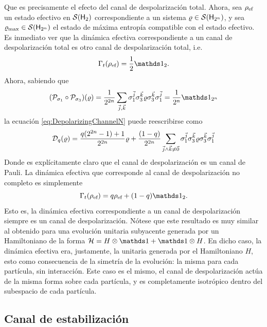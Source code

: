 Que es precisamente el efecto del canal de despolarización total. Ahora, sea $\rho_{\text{ef}}$ un estado efectivo en $\mathcal{S}({\sf H}_{2})$ correspondiente a un sistema $\varrho \in \mathcal{S}({\sf H}_{2^{n}})$, y sea $\varrho_{\max}\in\mathcal{S}({\sf H}_{2^{n}})$ el estado de máxima entropía compatible con el estado efectivo. Es inmediato ver que la dinámica efectiva correspondiente a un canal de despolarización total es otro canal de despolarización total, i.e.
\begin{equation}
    \Gamma_{t}(\rho_{\ef})=\frac{1}{2}\Id_{2}.
\end{equation}
Ahora, sabiendo que
\begin{equation}
    \qty(\mcP_{\pauli{1}}\circ \mcP_{\pauli{3}})(\varrho)=\frac{1}{2^{2n}}\sum_{\vec{j},\vec{k}}\pauli{1}^{\vec{j}}\pauli{3}^{\vec{k}}\varrho\pauli{3}^{\vec{k}}\pauli{1}^{\vec{j}}=\frac{1}{2^{n}}\Id_{2^{n}}\nonumber
\end{equation}
la ecuación \ref{eq:DepolarizingChannelN} puede reescribirse como
\begin{equation}
    \mathcal{D}_{q}(\varrho)=\frac{q(2^{2n}-1)+1}{2^{2n}}\varrho+\frac{(1-q)}{2^{2n}}\sum_{\vec{j}\land\vec{k}\neq\vec{0}}\sigma_{1}^{\vec{j}}\sigma_{3}^{\vec{k}}\varrho\sigma_{3}^{\vec{k}}\sigma_{1}^{\vec{j}}\nonumber
\end{equation}
Donde es explícitamente claro que el canal de despolarización es un canal de Pauli. La dinámica efectiva que corresponde al canal de despolarización no completo es simplemente
\begin{equation}\label{eq:EffectiveDepolarizing}
    \Gamma_{t}(\rho_{\ef})=q\rho_{\ef}+(1-q)\Id_{2}.
\end{equation}
Esto es, la dinámica efectiva correspondiente a un canal de despolarización siempre es un canal de despolarización. Nótese que este resultado es muy similar al obtenido para una evolución unitaria subyacente generada por un Hamiltoniano de la forma $\mcH=H\otimes\Id+\Id\otimes H$. En dicho caso, la dinámica efectiva era, justamente, la unitaria generada por el Hamiltoniano $H$, esto como consecuencia de la simetría de la evolución: la misma para cada partícula, sin interacción. Este caso es el mismo, el canal de despolarización actúa de la misma forma sobre cada partícula, y es completamente isotrópico dentro del subespacio de cada partícula.

\subsection{Canal de estabilización}

